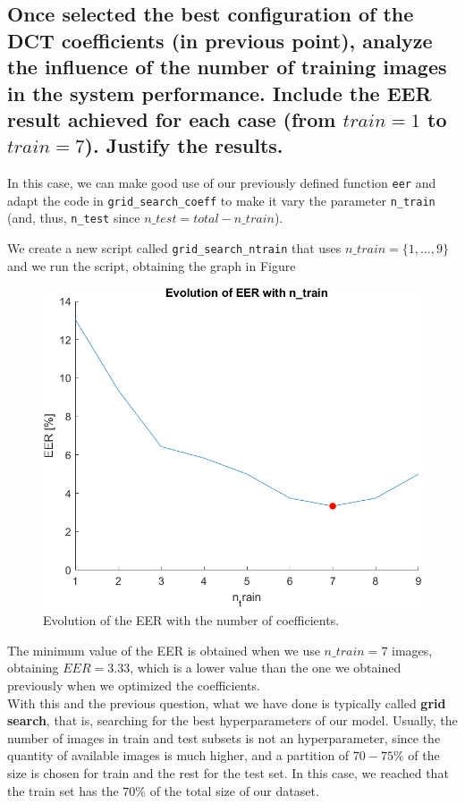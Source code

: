 \documentclass[a4paper]{article}
\def\inline{\lstinline[basicstyle=\ttfamily,keywordstyle={}]}
\begin{document}
\subsection{ Once selected the best configuration of the DCT coefficients (in previous point), analyze the influence of the number of training images in the system performance. Include the EER result achieved for each case (from \(train = 1\) to \(train = 7\)). Justify the results.}


In this case, we can make good use of our previously defined function \inline{eer} and adapt the code in \inline{grid_search_coeff} to make it vary the parameter \inline{n_train} (and, thus, \inline{n_test} since \(n\_test = total - n\_train\)).

We create a new script called \inline{grid_search_ntrain} that uses \(n\_train = \{1,\dots,9\}\) and we run the script, obtaining the graph in Figure 

\begin{figure}[H]
  \centering
  \includegraphics[scale=0.5]{Figures/EERvsNTRAIN}
    \caption{Evolution of the EER with the number of coefficients.}
    \label{fig:ex1d}
\end{figure}

The minimum value of the EER is obtained when we use \(n\_train = 7\) images, obtaining \(EER = 3.33\), which is a lower value than the one we obtained previously when we optimized the coefficients.\\ 


With this and the previous question, what we have done is typically called \textbf{grid search}, that is, searching for the best hyperparameters of our model. Usually, the number of images in train and test subsets is not an hyperparameter, since the quantity of available images is much higher, and a partition of \(70-75\%\) of the size is chosen for train and the rest for the test set. In this case, we reached that the train set has the \(70\%\) of the total size of our dataset. 
\end{document}
